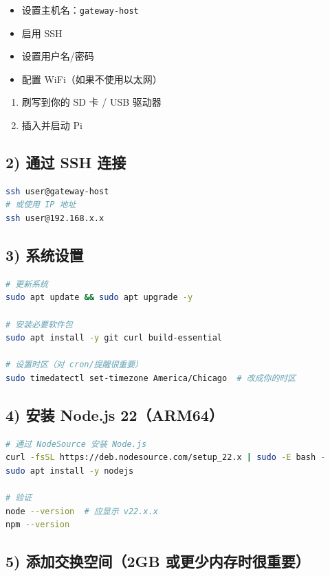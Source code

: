 \begin{itemize}
  \item 设置主机名：\texttt{gateway-host}
  \item 启用 SSH
  \item 设置用户名/密码
  \item 配置 WiFi（如果不使用以太网）
\end{itemize}

\begin{enumerate}
  \item 刷写到你的 SD 卡 / USB 驱动器
  \item 插入并启动 Pi
\end{enumerate}


\subsection{2) 通过 SSH 连接}


\begin{lstlisting}[language=bash]
ssh user@gateway-host
# 或使用 IP 地址
ssh user@192.168.x.x
\end{lstlisting}


\subsection{3) 系统设置}


\begin{lstlisting}[language=bash]
# 更新系统
sudo apt update && sudo apt upgrade -y

# 安装必要软件包
sudo apt install -y git curl build-essential

# 设置时区（对 cron/提醒很重要）
sudo timedatectl set-timezone America/Chicago  # 改成你的时区
\end{lstlisting}


\subsection{4) 安装 Node.js 22（ARM64）}


\begin{lstlisting}[language=bash]
# 通过 NodeSource 安装 Node.js
curl -fsSL https://deb.nodesource.com/setup_22.x | sudo -E bash -
sudo apt install -y nodejs

# 验证
node --version  # 应显示 v22.x.x
npm --version
\end{lstlisting}


\subsection{5) 添加交换空间（2GB 或更少内存时很重要）}


